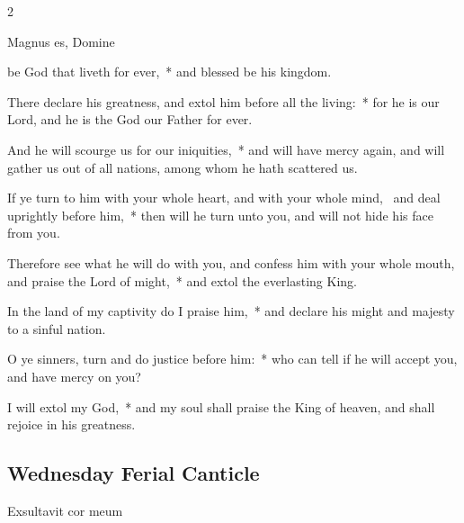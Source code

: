 \begin{multicols}{2}
\begin{inhead}
Magnus es, Domine
\end{inhead}

 be God that liveth for ever,~* and blessed be his kingdom.\par
{}
There declare his greatness, and extol him before all the living:~* for he is our Lord, and he is the God our Father for ever.\par
And he will scourge us for our iniquities,~* and will have mercy again, and will gather us out of all nations, among whom he hath scattered us.\par
If ye turn to him with your whole heart, and with your whole mind,~{\dag} and deal uprightly before him,~* then will he turn unto you, and will not hide his face from you.\par
Therefore see what he will do with you, and confess him with your whole mouth, and praise the Lord of might,~* and extol the everlasting King.\par
In the land of my captivity do I praise him,~* and declare his might and majesty to a sinful nation.\par
O ye sinners, turn and do justice before him:~* who can tell if he will accept you, and have mercy on you?\par
I will extol my God,~* and my soul shall praise the King of heaven, and shall rejoice in his greatness.

\subsection{Wednesday Ferial Canticle}

\begin{inhead}
Exsultavit cor meum
\end{inhead}


\end{multicols}
